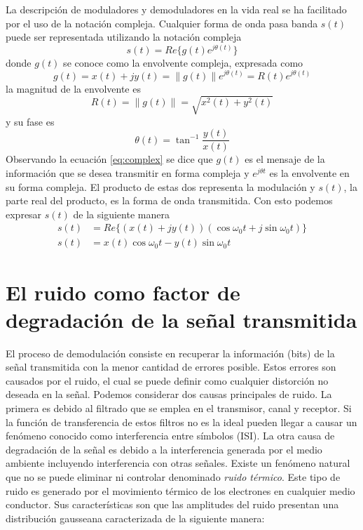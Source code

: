 La descripci\'on de moduladores y demoduladores en la vida real se ha facilitado
por el uso de la notaci\'on compleja. Cualquier forma de onda pasa banda $s(t)$ 
puede ser representada utilizando la notaci\'on compleja \cite{sklar}
\begin{equation}\label{eq:complex}
s(t)=Re\{g(t)e^{j\theta(t)}\}
\end{equation}
donde $g(t)$ se conoce como la envolvente compleja, expresada como
\begin{equation}\label{eq:comcar}
g(t)=x(t)+jy(t)=\|g(t)\|e^{j\theta(t)}=R(t)e^{j\theta(t)}
\end{equation}
la magnitud de la envolvente es
\begin{equation}\label{eq:mag}
R(t)=\|g(t)\|=\sqrt{x^2(t)+y^2(t)}
\end{equation}
y su fase es
\begin{equation}\label{eq:fase}
\theta(t)=\tan^{-1}\frac{y(t)}{x(t)}
\end{equation}
Observando la ecuaci\'on \eqref{eq:complex} se dice que $g(t)$ es el mensaje de
la informaci\'on que se desea transmitir en forma compleja y $e^{j\theta t}$ es la
envolvente en su forma compleja. El producto de estas dos representa la
modulaci\'on y $s(t)$, la parte real del producto, es la forma de onda
transmitida. Con esto podemos expresar $s(t)$ de la siguiente manera
\cite{sklar}
\begin{equation}\label{eq:compsimple}
\begin{aligned}
s(t)&=Re\{(x(t)+jy(t))(\cos\omega_0t+j\sin\omega_0t)\}\\
s(t)&=x(t)\cos\omega_0t-y(t)\sin\omega_0t
\end{aligned}
\end{equation}

\section{El ruido como factor de degradaci\'on de la se\~nal transmitida}

El proceso de demodulaci\'on consiste en recuperar la informaci\'on (bits) de la se\~nal
transmitida con la menor cantidad de errores posible. Estos errores son causados por el ruido, el
cual se puede definir como cualquier distorci\'on no deseada en la se\~nal. Podemos considerar dos
causas principales de ruido. La primera es debido al filtrado que se emplea en el transmisor, canal
y receptor. Si la funci\'on de transferencia de estos filtros no es la ideal pueden llegar a causar
un fen\'omeno conocido como interferencia entre s\'imbolos (ISI). La otra causa de degradaci\'on de
la se\~nal es debido a la interferencia generada por el medio ambiente incluyendo interferencia con
otras se\~nales. Existe un fen\'omeno natural que no se puede eliminar ni controlar denominado
\emph{ruido t\'ermico}. Este tipo de ruido es generado por el movimiento t\'ermico de los electrones
en cualquier medio conductor. Sus caracter\'isticas son que las amplitudes del ruido presentan una
distribuci\'on gausseana caracterizada de la siguiente manera:

